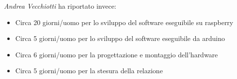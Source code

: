 \documentclass[12pt]{article}
\begin{document}
\textit{Andrea Vecchiotti} ha riportato invece:
\begin{itemize}
\item Circa 20 giorni/uomo per lo sviluppo del software eseguibile su raspberry
\item Circa 5 giorni/uomo per lo sviluppo del software eseguibile da arduino
\item Circa 6 giorni/uomo per la progettazione e montaggio dell'hardware
\item Circa 5 giorni/uomo per la stesura della relazione
\end{itemize}
\newpage


\end{document}
